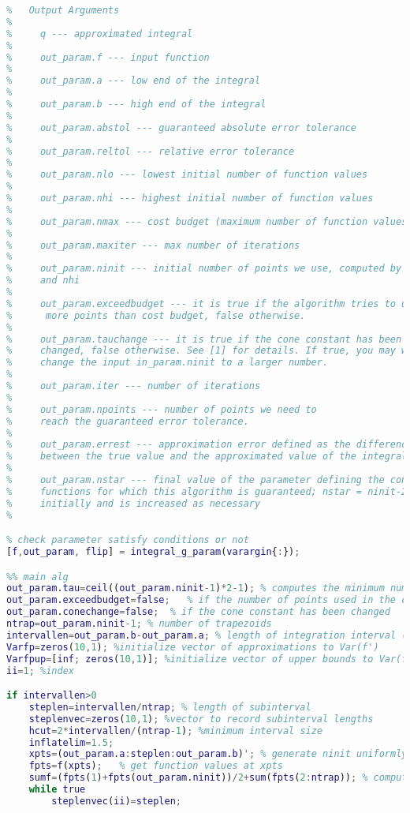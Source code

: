 \documentclass{iitthesis}
\begin{document}
\begin{lstlisting}[language=Matlab]
% 
%   Output Arguments
%
%     q --- approximated integral
%
%     out_param.f --- input function
%
%     out_param.a --- low end of the integral
%
%     out_param.b --- high end of the integral
%
%     out_param.abstol --- guaranteed absolute error tolerance
%
%     out_param.reltol --- relative error tolerance
% 
%     out_param.nlo --- lowest initial number of function values
%
%     out_param.nhi --- highest initial number of function values
%
%     out_param.nmax --- cost budget (maximum number of function values)
%
%     out_param.maxiter --- max number of iterations
%
%     out_param.ninit --- initial number of points we use, computed by nlo
%     and nhi
%
%     out_param.exceedbudget --- it is true if the algorithm tries to use 
%      more points than cost budget, false otherwise.
% 
%     out_param.tauchange --- it is true if the cone constant has been
%     changed, false otherwise. See [1] for details. If true, you may wish to
%     change the input in_param.ninit to a larger number.
% 
%     out_param.iter --- number of iterations
%
%     out_param.npoints --- number of points we need to 
%     reach the guaranteed error tolerance.
%
%     out_param.errest --- approximation error defined as the differences
%     between the true value and the approximated value of the integral.
%
%     out_param.nstar --- final value of the parameter defining the cone of
%     functions for which this algorithm is guaranteed; nstar = ninit-2
%     initially and is increased as necessary
%

% check parameter satisfy conditions or not
[f,out_param, flip] = integral_g_param(varargin{:});

%% main alg
out_param.tau=ceil((out_param.ninit-1)*2-1); % computes the minimum number of points to start
out_param.exceedbudget=false;   % if the number of points used in the calculation of q is less than cost budget
out_param.conechange=false;  % if the cone constant has been changed
ntrap=out_param.ninit-1; % number of trapezoids
intervallen=out_param.b-out_param.a; % length of integration interval (>=0)
Varfp=zeros(10,1); %initialize vector of approximations to Var(f')
Varfpup=[inf; zeros(10,1)]; %initialize vector of upper bounds to Var(f')
ii=1; %index

if intervallen>0   
    steplen=intervallen/ntrap; % length of subinterval
    steplenvec=zeros(10,1); %vector to record subinterval lengths
    hcut=2*intervallen/(ntrap-1); %minimum interval size
    inflatelim=1.5;
    xpts=(out_param.a:steplen:out_param.b)'; % generate ninit uniformly spaced points in [a,b]
    fpts=f(xpts);   % get function values at xpts
    sumf=(fpts(1)+fpts(out_param.ninit))/2+sum(fpts(2:ntrap)); % computes the sum of trapezoidal rule
    while true
        steplenvec(ii)=steplen;
        

\end{lstlisting}
\end{document}
